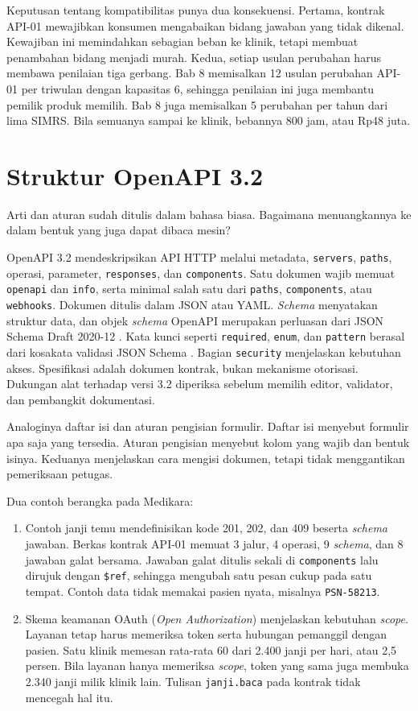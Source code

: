 Keputusan tentang kompatibilitas punya dua konsekuensi. Pertama, kontrak API-01 mewajibkan konsumen mengabaikan bidang jawaban yang tidak dikenal. Kewajiban ini memindahkan sebagian beban ke klinik,
tetapi membuat penambahan bidang menjadi murah. Kedua, setiap usulan perubahan harus membawa penilaian tiga gerbang. Bab 8 memisalkan 12 usulan perubahan API-01 per triwulan dengan kapasitas 6, sehingga
penilaian ini juga membantu pemilik produk memilih. Bab 8 juga memisalkan 5 perubahan per tahun dari lima SIMRS. Bila semuanya sampai ke klinik, bebannya 800 jam, atau Rp48 juta.

\section{Struktur OpenAPI 3.2}

Arti dan aturan sudah ditulis dalam bahasa biasa. Bagaimana menuangkannya ke dalam bentuk yang juga dapat dibaca mesin?

OpenAPI 3.2 mendeskripsikan API HTTP melalui metadata, \texttt{servers}, \texttt{paths}, operasi, parameter, \texttt{responses}, dan \texttt{components}. Satu dokumen wajib memuat \texttt{openapi} dan
\texttt{info}, serta minimal salah satu dari \texttt{paths}, \texttt{components}, atau \texttt{webhooks}. Dokumen ditulis dalam JSON atau YAML. \textit{Schema} menyatakan struktur data, dan objek \textit{schema} OpenAPI merupakan perluasan dari JSON Schema Draft
2020-12 \cite{openapi32}. Kata kunci seperti \texttt{required}, \texttt{enum}, dan \texttt{pattern} berasal dari kosakata validasi JSON Schema \cite{c09-jsonschema-validation}. Bagian \texttt{security}
menjelaskan kebutuhan akses. Spesifikasi adalah dokumen kontrak, bukan mekanisme otorisasi. Dukungan alat terhadap versi 3.2 diperiksa sebelum memilih editor, validator, dan pembangkit dokumentasi.

Analoginya daftar isi dan aturan pengisian formulir. Daftar isi menyebut formulir apa saja yang tersedia. Aturan pengisian menyebut kolom yang wajib dan bentuk isinya. Keduanya menjelaskan cara mengisi
dokumen, tetapi tidak menggantikan pemeriksaan petugas.

Dua contoh berangka pada Medikara:
\begin{enumerate}
  \item Contoh janji temu mendefinisikan kode 201, 202, dan 409 beserta \textit{schema} jawaban. Berkas kontrak API-01 memuat 3 jalur, 4 operasi, 9 \textit{schema}, dan 8 jawaban galat bersama. Jawaban galat ditulis
        sekali di \texttt{components} lalu dirujuk dengan \texttt{\$ref}, sehingga mengubah satu pesan cukup pada satu tempat. Contoh data tidak memakai pasien nyata, misalnya \texttt{PSN-58213}.
  \item Skema keamanan OAuth (\textit{Open Authorization}) menjelaskan kebutuhan \textit{scope}. Layanan tetap harus memeriksa token serta hubungan pemanggil dengan pasien. Satu klinik memesan rata-rata 60 dari 2.400
        janji per hari, atau 2,5 persen. Bila layanan hanya memeriksa \textit{scope}, token yang sama juga membuka 2.340 janji milik klinik lain. Tulisan \texttt{janji.baca} pada kontrak tidak mencegah hal itu.
\end{enumerate}

